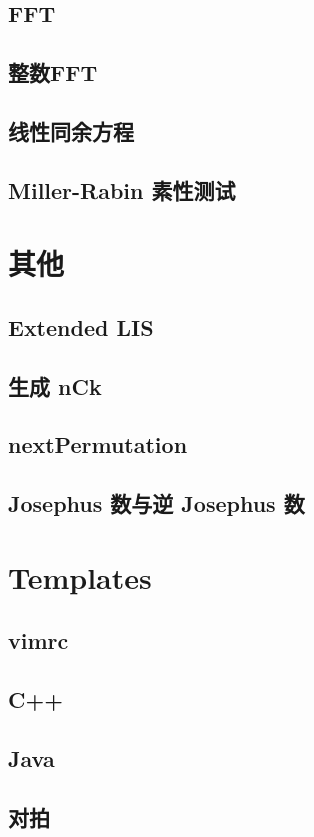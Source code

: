 \documentclass[10pt]{article}
\begin{document}
	\subsection{FFT}
		

	\subsection{整数FFT}
		

	\subsection{线性同余方程}
		

	\subsection{Miller-Rabin 素性测试}
		

\section{其他}
	\subsection{Extended LIS}
		

	\subsection{生成 nCk}
		

	\subsection{nextPermutation}
		

	\subsection{Josephus 数与逆 Josephus 数}	
		

\section{Templates}
	\subsection{vimrc}
		
	\subsection{C++}
		
	\subsection{Java}
		
	\subsection{对拍}
		
\end{document}
